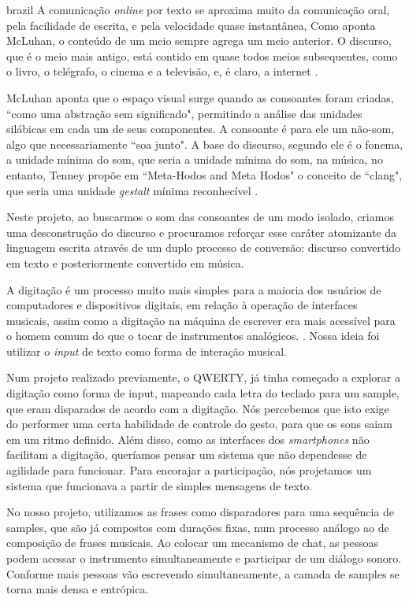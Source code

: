 \begin{otherlanguage*}{brazil}
A comunicação \emph{online} por texto se aproxima muito da comunicação oral, pela facilidade de escrita, e pela velocidade quase instantânea,\cite[33]{Levinson2001} Como aponta McLuhan, o conteúdo de um meio sempre agrega um meio anterior. O discurso, que é o meio mais antigo, está contido em quase todos meios subsequentes, como o livro, o telégrafo, o cinema e a televisão, e, é claro, a internet \cite[42]{Levinson2001}. 

McLuhan aponta que o espaço visual surge quando as consoantes foram criadas, ``como uma abstração sem significado", permitindo a análise das unidades silábicas em cada um de seus componentes. A consoante é para ele um não-som, algo que necessariamente ``soa junto". \cite[13-14]{mcluhan1968comunicaccoes} A base do discurso, segundo ele é o fonema, a unidade mínima do som, que seria a unidade mínima do som, na música, no entanto, Tenney  propõe em ``Meta-Hodos and Meta Hodos" o conceito de ``clang", que seria uma unidade \emph{gestalt} mínima reconhecível \cite[23]{Tenney1988}. 

Neste projeto, ao buscarmos o som das consoantes de um modo isolado, criamos uma desconstrução do discurso e procuramos reforçar esse caráter atomizante da linguagem escrita através de um duplo processo de conversão: discurso convertido em texto e posteriormente convertido em música.

A digitação é um processo muito mais simples para a maioria dos usuários de computadores e dispositivos digitais, em relação à operação de interfaces musicais, assim como a digitação na máquina de escrever era mais acessível para o homem comum do que o tocar de instrumentos analógicos. \cite[172]{Levinson2001}. Nossa ideia foi utilizar o \emph{input} de texto como forma de interação musical. 

Num projeto realizado previamente, o QWERTY, já tinha começado a explorar a digitação como forma de input, mapeando cada letra do teclado para um sample, que eram disparados de acordo com a digitação. Nós percebemos que isto exige do performer uma certa habilidade de controle do gesto, para que os sons saiam em um ritmo definido. Além disso, como as interfaces dos \emph{smartphones} não facilitam a digitação, queríamos pensar um sistema que não dependesse de agilidade para funcionar. Para encorajar a participação, nós projetamos um sistema que funcionava a partir de simples mensagens de texto.

No nosso projeto, utilizamos as frases como disparadores para uma sequência de samples, que são já compostos com durações fixas, num processo análogo ao de composição de frases musicais. Ao colocar um mecanismo de chat, as pessoas podem acessar o instrumento simultaneamente e participar de um diálogo sonoro. Conforme mais pessoas vão escrevendo simultaneamente, a camada de samples se torna mais densa e entrópica.


\end{otherlanguage*}
